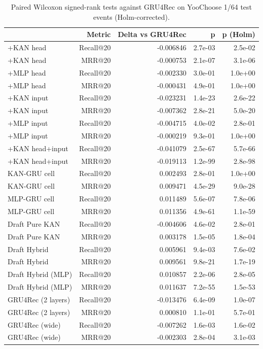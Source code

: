 \begin{table}[H]
\centering\small
\caption{Paired Wilcoxon signed-rank tests against GRU4Rec on YooChoose 1/64 test events (Holm-corrected).}
\label{tab:sig_yoochoose64}
\begin{tabular}{lrrrr}
\toprule
 & Metric & Delta vs GRU4Rec & p & p (Holm) \\
\midrule
+KAN head & Recall@20 & -0.006846 & 2.7e-03 & 2.5e-02 \\
+KAN head & MRR@20 & -0.000753 & 2.1e-07 & 3.1e-06 \\
+MLP head & Recall@20 & -0.002330 & 3.0e-01 & 1.0e+00 \\
+MLP head & MRR@20 & -0.000431 & 4.9e-01 & 1.0e+00 \\
+KAN input & Recall@20 & -0.023231 & 1.4e-23 & 2.6e-22 \\
+KAN input & MRR@20 & -0.007362 & 2.8e-21 & 5.0e-20 \\
+MLP input & Recall@20 & -0.004715 & 4.0e-02 & 2.8e-01 \\
+MLP input & MRR@20 & -0.000219 & 9.3e-01 & 1.0e+00 \\
+KAN head+input & Recall@20 & -0.041079 & 2.5e-67 & 5.7e-66 \\
+KAN head+input & MRR@20 & -0.019113 & 1.2e-99 & 2.8e-98 \\
KAN-GRU cell & Recall@20 & 0.002493 & 2.8e-01 & 1.0e+00 \\
KAN-GRU cell & MRR@20 & 0.009471 & 4.5e-29 & 9.0e-28 \\
MLP-GRU cell & Recall@20 & 0.011489 & 5.6e-07 & 7.8e-06 \\
MLP-GRU cell & MRR@20 & 0.011356 & 4.9e-61 & 1.1e-59 \\
Draft Pure KAN & Recall@20 & -0.004606 & 4.6e-02 & 2.8e-01 \\
Draft Pure KAN & MRR@20 & 0.003178 & 1.5e-05 & 1.8e-04 \\
Draft Hybrid & Recall@20 & 0.005961 & 9.4e-03 & 7.6e-02 \\
Draft Hybrid & MRR@20 & 0.009561 & 9.8e-21 & 1.7e-19 \\
Draft Hybrid (MLP) & Recall@20 & 0.010857 & 2.2e-06 & 2.8e-05 \\
Draft Hybrid (MLP) & MRR@20 & 0.011637 & 7.2e-55 & 1.5e-53 \\
GRU4Rec (2 layers) & Recall@20 & -0.013476 & 6.4e-09 & 1.0e-07 \\
GRU4Rec (2 layers) & MRR@20 & 0.000810 & 1.1e-01 & 5.7e-01 \\
GRU4Rec (wide) & Recall@20 & -0.007262 & 1.6e-03 & 1.6e-02 \\
GRU4Rec (wide) & MRR@20 & -0.002303 & 2.8e-04 & 3.1e-03 \\
\bottomrule
\end{tabular}
\end{table}
